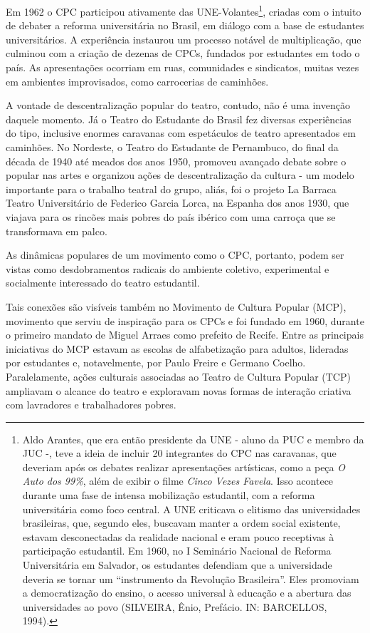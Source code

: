 Em 1962 o CPC participou ativamente das UNE-Volantes\footnote{Aldo
  Arantes, que era então presidente da UNE - aluno da PUC e membro da
  JUC -, teve a ideia de incluir 20 integrantes do CPC nas caravanas,
  que deveriam após os debates realizar apresentações artísticas, como a
  peça \textit{O Auto dos 99\%}, além de exibir o filme
  \textit{Cinco Vezes Favela}. Isso acontece durante uma fase de intensa
  mobilização estudantil, com a reforma universitária como foco central.
  A UNE criticava o elitismo das universidades brasileiras, que, segundo
  eles, buscavam manter a ordem social existente, estavam desconectadas
  da realidade nacional e eram pouco receptivas à participação
  estudantil. Em 1960, no I Seminário Nacional de Reforma Universitária
  em Salvador, os estudantes defendiam que a universidade deveria se
  tornar um “instrumento da Revolução Brasileira”. Eles promoviam a
  democratização do ensino, o acesso universal à educação e a abertura
  das universidades ao povo (SILVEIRA, Ênio, Prefácio. IN: BARCELLOS,
  1994).}, criadas com o intuito de debater a reforma universitária no
Brasil, em diálogo com a base de estudantes universitários. A
experiência instaurou um processo notável de multiplicação, que culminou
com a criação de dezenas de CPCs, fundados por estudantes em todo o
país. As apresentações ocorriam em ruas, comunidades e sindicatos,
muitas vezes em ambientes improvisados, como carrocerias de caminhões.

A vontade de descentralização popular do teatro, contudo, não é uma
invenção daquele momento. Já o Teatro do Estudante do Brasil fez
diversas experiências do tipo, inclusive enormes caravanas com
espetáculos de teatro apresentados em caminhões. No Nordeste, o Teatro
do Estudante de Pernambuco, do final da década de 1940 até meados dos
anos 1950, promoveu avançado debate sobre o popular nas artes e
organizou ações de descentralização da cultura - um modelo importante
para o trabalho teatral do grupo, aliás, foi o projeto La Barraca Teatro
Universitário de Federico Garcia Lorca, na Espanha dos anos 1930, que
viajava para os rincões mais pobres do país ibérico com uma carroça que
se transformava em palco.

As dinâmicas populares de um movimento como o CPC, portanto, podem ser
vistas como desdobramentos radicais do ambiente coletivo, experimental e
socialmente interessado do teatro estudantil.

Tais conexões são visíveis também no Movimento de Cultura Popular (MCP),
movimento que serviu de inspiração para os CPCs e foi fundado em 1960,
durante o primeiro mandato de Miguel Arraes como prefeito de Recife.
Entre as principais iniciativas do MCP estavam as escolas de
alfabetização para adultos, lideradas por estudantes e, notavelmente,
por Paulo Freire e Germano Coelho. Paralelamente, ações culturais
associadas ao Teatro de Cultura Popular (TCP) ampliavam o alcance do
teatro e exploravam novas formas de interação criativa com lavradores e
trabalhadores pobres.

